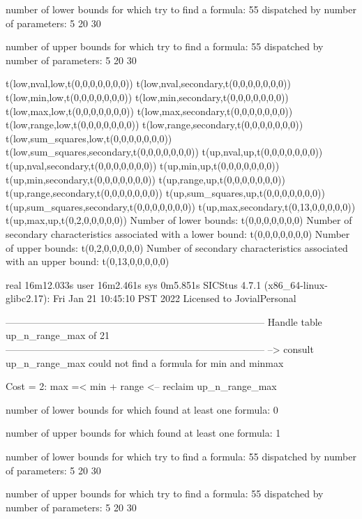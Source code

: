 number of lower bounds for which try to find a formula: 55
dispatched by number of parameters: 5  20  30

number of upper bounds for which try to find a formula: 55
dispatched by number of parameters: 5  20  30

t(low,nval,low,t(0,0,0,0,0,0,0))
t(low,nval,secondary,t(0,0,0,0,0,0,0))
t(low,min,low,t(0,0,0,0,0,0,0))
t(low,min,secondary,t(0,0,0,0,0,0,0))
t(low,max,low,t(0,0,0,0,0,0,0))
t(low,max,secondary,t(0,0,0,0,0,0,0))
t(low,range,low,t(0,0,0,0,0,0,0))
t(low,range,secondary,t(0,0,0,0,0,0,0))
t(low,sum_squares,low,t(0,0,0,0,0,0,0))
t(low,sum_squares,secondary,t(0,0,0,0,0,0,0))
t(up,nval,up,t(0,0,0,0,0,0,0))
t(up,nval,secondary,t(0,0,0,0,0,0,0))
t(up,min,up,t(0,0,0,0,0,0,0))
t(up,min,secondary,t(0,0,0,0,0,0,0))
t(up,range,up,t(0,0,0,0,0,0,0))
t(up,range,secondary,t(0,0,0,0,0,0,0))
t(up,sum_squares,up,t(0,0,0,0,0,0,0))
t(up,sum_squares,secondary,t(0,0,0,0,0,0,0))
t(up,max,secondary,t(0,13,0,0,0,0,0))
t(up,max,up,t(0,2,0,0,0,0,0))
Number of lower bounds:                                             t(0,0,0,0,0,0,0)
Number of secondary characteristics associated with a lower bound:  t(0,0,0,0,0,0,0)
Number of upper bounds:                                             t(0,2,0,0,0,0,0)
Number of secondary characteristics associated with an upper bound: t(0,13,0,0,0,0,0)

real	16m12.033s
user	16m2.461s
sys	0m5.851s
SICStus 4.7.1 (x86_64-linux-glibc2.17): Fri Jan 21 10:45:10 PST 2022
Licensed to JovialPersonal


--------------------------------------------------------------------------------
Handle table up_n_range_max of 21
--------------------------------------------------------------------------------
--> consult up_n_range_max
could not find a formula for min and minmax

Cost =  2:  max =< min + range
<-- reclaim up_n_range_max

number of lower bounds for which found at least one formula: 0

number of upper bounds for which found at least one formula: 1

number of lower bounds for which try to find a formula: 55
dispatched by number of parameters: 5  20  30

number of upper bounds for which try to find a formula: 55
dispatched by number of parameters: 5  20  30

